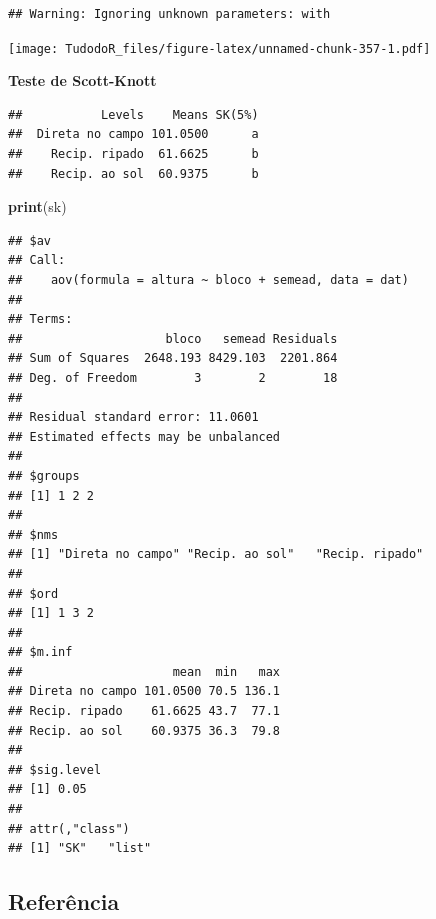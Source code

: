 \documentclass[
]{book}
\newenvironment{Shaded}{\begin{snugshade}}{\end{snugshade}}
\newcommand{\DataTypeTok}[1]{\textcolor[rgb]{0.13,0.29,0.53}{#1}}
\newcommand{\KeywordTok}[1]{\textcolor[rgb]{0.13,0.29,0.53}{\textbf{#1}}}
\newcommand{\NormalTok}[1]{#1}
\newcommand{\OperatorTok}[1]{\textcolor[rgb]{0.81,0.36,0.00}{\textbf{#1}}}
\newcommand{\StringTok}[1]{\textcolor[rgb]{0.31,0.60,0.02}{#1}}
\begin{document}
\begin{verbatim}
## Warning: Ignoring unknown parameters: with
\end{verbatim}

\texttt{[image: TudodoR\_files/figure-latex/unnamed-chunk-357-1.pdf]}

\textbf{Teste de Scott-Knott}

\begin{Shaded}
\end{Shaded}

\begin{verbatim}
##           Levels    Means SK(5%)
##  Direta no campo 101.0500      a
##    Recip. ripado  61.6625      b
##    Recip. ao sol  60.9375      b
\end{verbatim}

\begin{Shaded}
\begin{Highlighting}[]
\KeywordTok{print}\NormalTok{(sk)}
\end{Highlighting}
\end{Shaded}

\begin{verbatim}
## $av
## Call:
##    aov(formula = altura ~ bloco + semead, data = dat)
## 
## Terms:
##                    bloco   semead Residuals
## Sum of Squares  2648.193 8429.103  2201.864
## Deg. of Freedom        3        2        18
## 
## Residual standard error: 11.0601
## Estimated effects may be unbalanced
## 
## $groups
## [1] 1 2 2
## 
## $nms
## [1] "Direta no campo" "Recip. ao sol"   "Recip. ripado"  
## 
## $ord
## [1] 1 3 2
## 
## $m.inf
##                     mean  min   max
## Direta no campo 101.0500 70.5 136.1
## Recip. ripado    61.6625 43.7  77.1
## Recip. ao sol    60.9375 36.3  79.8
## 
## $sig.level
## [1] 0.05
## 
## attr(,"class")
## [1] "SK"   "list"
\end{verbatim}

\hypertarget{referuxeancia-5}{%
\subsection{Referência}\label{referuxeancia-5}}
\end{document}
